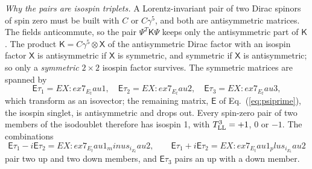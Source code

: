 \documentclass[aps,prd,twocolumn,superscriptaddress,nofootinbib,floatfix,longbibliography]{revtex4-2}
\newcommand{\LL}{{\rm LL}}
\begin{document}
\emph{Why the pairs are isospin triplets.} A Lorentz-invariant pair of two Dirac spinors of spin zero must be built with
$C$ or $C\gamma^5$, and both are antisymmetric matrices. The fields anticommute, so the pair $\Psi^T\mathsf K\Psi$ keeps only
the antisymmetric part of $\mathsf K$. The product $\mathsf K=C\gamma^5\otimes\mathsf X$ of the antisymmetric Dirac factor
with an isospin factor $\mathsf X$ is antisymmetric if $\mathsf X$ is symmetric, and symmetric if $\mathsf X$ is
antisymmetric; so only a \emph{symmetric} $2\times2$ isospin factor survives. The symmetric matrices are spanned by
\begin{equation}
\mathsf E\tau_1={{EX:ex7_E_tau1}},\quad\mathsf E\tau_2={{EX:ex7_E_tau2}},\quad\mathsf E\tau_3={{EX:ex7_E_tau3}},
\label{eq:Etau}
\end{equation}
which transform as an isovector; the remaining matrix, $\mathsf E$ of Eq.~(\ref{eq:psiprime}), the isospin singlet, is
antisymmetric and drops out. Every spin-zero pair of two members of the isodoublet therefore has isospin 1, with
$T^3_\LL=+1$, $0$ or $-1$. The combinations
\begin{equation}
\mathsf E\tau_1-i\mathsf E\tau_2={{EX:ex7_E_tau1_minus_i_E_tau2}},\qquad\mathsf E\tau_1+i\mathsf
E\tau_2={{EX:ex7_E_tau1_plus_i_E_tau2}}
\label{eq:Etaupm}
\end{equation}
pair two up and two down members, and $\mathsf E\tau_3$ pairs an up with a down member.
\end{document}
